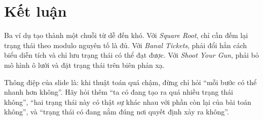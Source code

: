 \documentclass[11pt]{article}
\begin{document}
\section{Kết luận}

Ba ví dụ tạo thành một chuỗi từ dễ đến khó. Với \textit{Square Root}, chỉ cần
đếm lại trạng thái theo modulo nguyên tố là đủ. Với \textit{Banal Tickets},
phải đổi hẳn cách biểu diễn tích và chỉ lưu trạng thái có thể đạt được. Với
\textit{Shoot Your Gun}, phải bỏ mô hình ô lưới và đặt trạng thái trên biên
phản xạ.

Thông điệp của slide là: khi thuật toán quá chậm, đừng chỉ hỏi ``mỗi bước có
thể nhanh hơn không''. Hãy hỏi thêm ``ta có đang tạo ra quá nhiều trạng thái
không'', ``hai trạng thái này có thật sự khác nhau với phần còn lại của bài
toán không'', và ``trạng thái có đang nằm đúng nơi quyết định xảy ra không''.
\end{document}
